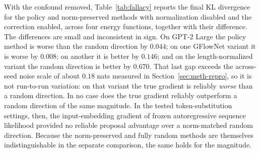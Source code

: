 With the confound removed, Table~\ref{tab:fallacy} reports the final KL divergence for the policy and norm-preserved methods with normalization disabled and the correction enabled, across four energy functions, together with their difference.
The differences are small and inconsistent in sign. On GPT-2 Large the policy method is worse than the random direction by $0.044$; on one GFlowNet variant it is worse by $0.008$; on another it is better by $0.146$; and on the length-normalized variant the random direction is better by $0.670$. That last gap exceeds the across-seed noise scale of about $0.18$ nats measured in Section~\ref{sec:meth-repro}, so it is not run-to-run variation: on that variant the true gradient is reliably \emph{worse} than a random direction. In no case does the true gradient reliably outperform a random direction of the same magnitude. In the tested token-substitution settings, then, the input-embedding gradient of frozen autoregressive sequence likelihood provided no reliable proposal advantage over a norm-matched random direction. Because the norm-preserved and fully random methods are themselves indistinguishable in the separate comparison, the same holds for the magnitude.

